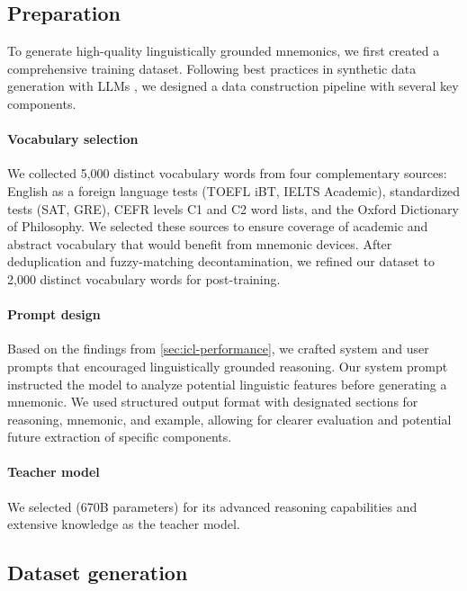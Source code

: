 \subsection{Preparation} \label{sec:data-prep}
To generate high-quality linguistically grounded mnemonics, we first created a comprehensive training dataset. Following best practices in synthetic data generation with LLMs \citetext{\citealp{longLLMsDrivenSyntheticData2024b}, \citealp{openthoughtsteamOpenThoughts2025}}, we designed a data construction pipeline with several key components.

\paragraph*{Vocabulary selection} We collected 5,000 distinct vocabulary words from four complementary sources: English as a foreign language tests (TOEFL iBT, IELTS Academic), standardized tests (SAT, GRE), CEFR levels C1 and C2 word lists, and the Oxford Dictionary of Philosophy. We selected these sources to ensure coverage of academic and abstract vocabulary that would benefit from mnemonic devices. After deduplication and fuzzy-matching decontamination, we refined our dataset to 2,000 distinct vocabulary words for post-training.

\paragraph*{Prompt design} Based on the findings from \cref{sec:icl-performance}, we crafted system and user prompts that encouraged linguistically grounded reasoning. Our system prompt instructed the model to analyze potential linguistic features before generating a mnemonic. We used structured output format with designated sections for reasoning, mnemonic, and example, allowing for clearer evaluation and potential future extraction of specific components.

\paragraph*{Teacher model} We selected \teachermodel (670B parameters) \citep{DeepSeek-AIDEEPSEEKR12025} for its advanced reasoning capabilities and extensive knowledge as the teacher model.

\subsection{Dataset generation} \label{sec:data-gen}

